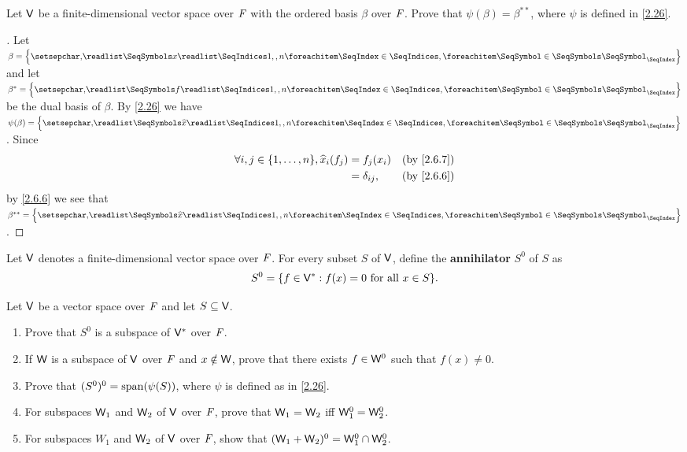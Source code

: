 \begin{ex}\label{ex:2.6.12}
  Let \(\mathsf{V}\) be a finite-dimensional vector space over \(\mathit{F}\) with the ordered basis \(\beta\) over \(\mathit{F}\).
  Prove that \(\psi(\beta) = \beta^{**}\), where \(\psi\) is defined in \cref{2.26}.
\end{ex}

\begin{proof}[]
  Let \(\beta = \set{\seq{x}{1,,n}}\) and let \(\beta^* = \set{\seq{f}{1,,n}}\) be the dual basis of \(\beta\).
  By \cref{2.26} we have \(\psi(\beta) = \set{\seq{\widehat{x}}{1,,n}}\).
  Since
  \begin{align*}
    \forall i, j \in \set{1, \dots, n}, \widehat{x}_i(f_j) & = f_j(x_i)      &  & \text{(by \cref{2.6.7})} \\
                                                           & = \delta_{i j}, &  & \text{(by \cref{2.6.6})}
  \end{align*}
  by \cref{2.6.6} we see that \(\beta^{**} = \set{\seq{\widehat{x}}{1,,n}}\).
\end{proof}

\begin{defn}\label{2.6.10}
  Let \(\mathsf{V}\) denotes a finite-dimensional vector space over \(\mathit{F}\).
  For every subset \(S\) of \(\mathsf{V}\), define the \textbf{annihilator} \(S^0\) of \(S\) as
  \[
    S^0 = \set{f \in \V^* : f(x) = 0 \text{ for all } x \in S}.
  \]
\end{defn}

\begin{ex}\label{ex:2.6.13}
  Let \(\mathsf{V}\) be a vector space over \(\mathit{F}\) and let \(S \subseteq \mathsf{V}\).
  \begin{enumerate}
    \item Prove that \(S^0\) is a subspace of \(\mathsf{V}^*\) over \(\mathit{F}\).
    \item If \(\mathsf{W}\) is a subspace of \(\mathsf{V}\) over \(\mathit{F}\) and \(x \notin \mathsf{W}\), prove that there exists \(f \in \mathsf{W}^0\) such that \(f(x) \neq 0\).
    \item Prove that \((S^0)^0 = \spn{\psi(S)}\), where \(\psi\) is defined as in \cref{2.26}.
    \item For subspaces \(\mathsf{W}_1\) and \(\mathsf{W}_2\) of \(\mathsf{V}\) over \(\mathit{F}\), prove that \(\mathsf{W}_1 = \mathsf{W}_2\) iff \(\mathsf{W}_1^0 = \mathsf{W}_2^0\).
    \item For subspaces \(W_1\) and \(\mathsf{W}_2\) of \(\mathsf{V}\) over \(\mathit{F}\), show that \((\mathsf{W}_1 + \mathsf{W}_2)^0 = \mathsf{W}_1^0 \cap \mathsf{W}_2^0\).
  \end{enumerate}
\end{ex}

